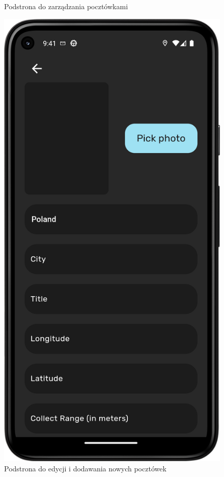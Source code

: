 \documentclass[a4paper,twoside,12pt]{book}
\begin{document}
\begin{figure}[H]
\begin{minipage}[b]{0.49\textwidth}
    \caption{Podstrona do zarządzania pocztówkami}
  \end{minipage}
  \hfill
  \begin{minipage}[b]{0.49\textwidth}
    \includegraphics[width=\textwidth]{mobile_ss/admin_edit.png}
    \caption{Podstrona do edycji i dodawania nowych pocztówek}
  \end{minipage}
\end{figure}
\end{document}
